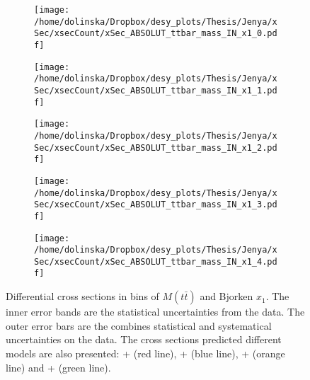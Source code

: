 \begin{sidewaysfigure}[p]
\centering
\begin{subfigure}
  \centering
  \texttt{[image: /home/dolinska/Dropbox/desy\_plots/Thesis/Jenya/xSec/xsecCount/xSec\_ABSOLUT\_ttbar\_mass\_IN\_x1\_0.pdf]}
\end{subfigure}
\begin{subfigure}
  \centering
  \texttt{[image: /home/dolinska/Dropbox/desy\_plots/Thesis/Jenya/xSec/xsecCount/xSec\_ABSOLUT\_ttbar\_mass\_IN\_x1\_1.pdf]}
\end{subfigure}
\begin{subfigure}
  \centering
  \texttt{[image: /home/dolinska/Dropbox/desy\_plots/Thesis/Jenya/xSec/xsecCount/xSec\_ABSOLUT\_ttbar\_mass\_IN\_x1\_2.pdf]}
\end{subfigure}
\begin{subfigure}
  \centering
  \texttt{[image: /home/dolinska/Dropbox/desy\_plots/Thesis/Jenya/xSec/xsecCount/xSec\_ABSOLUT\_ttbar\_mass\_IN\_x1\_3.pdf]}
\end{subfigure}
\begin{subfigure}
  \centering
  \texttt{[image: /home/dolinska/Dropbox/desy\_plots/Thesis/Jenya/xSec/xsecCount/xSec\_ABSOLUT\_ttbar\_mass\_IN\_x1\_4.pdf]}
\end{subfigure}
\caption{Differential cross sections in bins of $M(t\bar{t})$ and Bjorken $x_{1}$. The inner error bands are the statistical uncertainties from the data.
         The outer error bars are the combines statistical and systematical uncertainties on the data. The cross sections predicted different models are also presented:
         \MG + \PYTHIA (red line), \Powheg + \PYTHIA (blue line), \Powheg + \HERWIG (orange line) and \MCNLO + \HERWIG (green line).}
\label{fig:XSU_2D_x1_Mtt1}
\end{sidewaysfigure}

